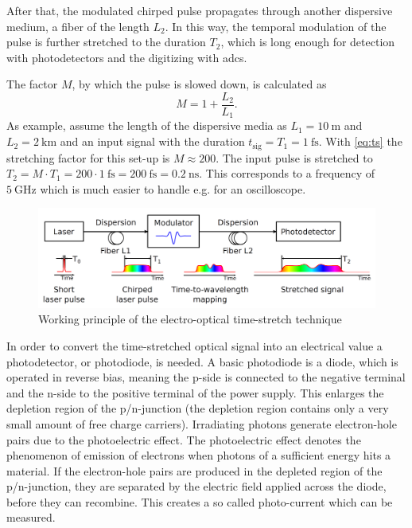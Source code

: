 After that, the modulated chirped pulse propagates through another dispersive medium, a fiber of the length $L_2$.
In this way, the temporal modulation of the pulse is further stretched to the duration $T_2$, which is long enough for detection with photodetectors and the digitizing with \Glspl{adc}. \cite{roussel2014}

The factor $M$, by which the pulse is slowed down, is calculated as
\begin{equation}\label{eq:ts}
	M = 1 + \frac{L_2}{L_1}.
\end{equation}
As example, assume the length of the dispersive media as $L_1 = \SI{10}{\meter}$ and $L_2 = \SI{2}{\kilo \meter}$ and an input signal with the duration $t_\text{sig} = T_1 = \SI{1}{\femto \second}$. With \autoref{eq:ts} the stretching factor for this set-up is $M \approx 200$. The input pulse is stretched to $T_2 = M \cdot T_1 = 200 \cdot \SI{1}{\femto \second} = \SI{200}{\femto \second} = \SI{0.2}{\nano \second}$. This corresponds to a frequency of $\SI{5}{\GHz}$ which is much easier to handle e.g. for an oscilloscope.
\begin{figure}[tbh]
	\centering
	\includegraphics[width = \textwidth]{chap/02-theory/img/time_stretch.png}
	\caption{Working principle of the electro-optical time-stretch technique \cite{roussel2014}}
	\label{fig:eo_ts}
\end{figure}

In order to convert the time-stretched optical signal into an electrical value a photodetector, or photodiode, is needed.
A basic photodiode is a diode, which is operated in reverse bias, meaning the p-side is connected to the negative terminal and the n-side to the positive terminal of the power supply.
This enlarges the depletion region of the p/n-junction (the depletion region contains only a very small amount of free charge carriers). 
Irradiating photons generate electron-hole pairs due to the photoelectric effect. 
The photoelectric effect denotes the phenomenon of emission of electrons when photons of a sufficient energy hits a material.  
If the electron-hole pairs are produced in the depleted region of the p/n-junction, they are separated by the electric field applied across the diode, before they can recombine. 
This creates a so called photo-current which can be measured. \cite{photodiode}


